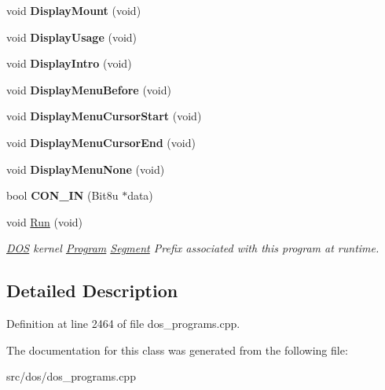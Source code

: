 \begin{DoxyCompactItemize}
\item 
\hypertarget{classINTRO_a5c6e294e686b9c667e58bd2ca8e13bb4}{void {\bfseries Display\-Mount} (void)}\label{classINTRO_a5c6e294e686b9c667e58bd2ca8e13bb4}

\item 
\hypertarget{classINTRO_a4857619c9d351417a9a8c87b29bed52c}{void {\bfseries Display\-Usage} (void)}\label{classINTRO_a4857619c9d351417a9a8c87b29bed52c}

\item 
\hypertarget{classINTRO_a3e68c8cde2fce914c656154f273f7149}{void {\bfseries Display\-Intro} (void)}\label{classINTRO_a3e68c8cde2fce914c656154f273f7149}

\item 
\hypertarget{classINTRO_a0c242eac779e67c6168613e6b2a81290}{void {\bfseries Display\-Menu\-Before} (void)}\label{classINTRO_a0c242eac779e67c6168613e6b2a81290}

\item 
\hypertarget{classINTRO_a53f19e5f292278bcd847a8a44b0bdc5d}{void {\bfseries Display\-Menu\-Cursor\-Start} (void)}\label{classINTRO_a53f19e5f292278bcd847a8a44b0bdc5d}

\item 
\hypertarget{classINTRO_a3ed7b89911f2fbd3f0b5a8412d9d91c5}{void {\bfseries Display\-Menu\-Cursor\-End} (void)}\label{classINTRO_a3ed7b89911f2fbd3f0b5a8412d9d91c5}

\item 
\hypertarget{classINTRO_a83e703c1fe7702783fbd1ce1320235a6}{void {\bfseries Display\-Menu\-None} (void)}\label{classINTRO_a83e703c1fe7702783fbd1ce1320235a6}

\item 
\hypertarget{classINTRO_ab717779f33410fb437dfb3b82fcf8e65}{bool {\bfseries C\-O\-N\-\_\-\-I\-N} (Bit8u $\ast$data)}\label{classINTRO_ab717779f33410fb437dfb3b82fcf8e65}

\item 
\hypertarget{classINTRO_a7fe083b2cab4fe79e280b030cc542fd3}{void \hyperlink{classINTRO_a7fe083b2cab4fe79e280b030cc542fd3}{Run} (void)}\label{classINTRO_a7fe083b2cab4fe79e280b030cc542fd3}

\begin{DoxyCompactList}\small\item\em \hyperlink{classDOS}{D\-O\-S} kernel \hyperlink{classProgram}{Program} \hyperlink{structSegment}{Segment} Prefix associated with this program at runtime. \end{DoxyCompactList}\end{DoxyCompactItemize}


\subsection{Detailed Description}


Definition at line 2464 of file dos\-\_\-programs.\-cpp.



The documentation for this class was generated from the following file\-:\begin{DoxyCompactItemize}
\item 
src/dos/dos\-\_\-programs.\-cpp\end{DoxyCompactItemize}
